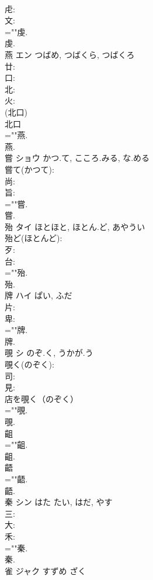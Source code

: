 \documentclass[8pt]{extreport}
\begin{document}
\begin{CJK}{UTF8}{min}
\\	虍: 
\\	文: 
\\	=""虔.
\\	虔.
\\	燕	エン	つばめ, つばくら, つばくろ		
\\	廿: 
\\	口: 
\\	北: 
\\	火: 
\\	(北口) 
\\	北口 
\\	=""燕.
\\	燕.
\\	嘗	ショウ	かつ.て, こころ.みる, な.める		
\\	嘗て(かつて): 
\\	尚: 
\\	旨: 
\\	=""嘗.
\\	嘗.
\\	殆	タイ	ほとほと, ほとん.ど, あやうい		
\\	殆ど(ほとんど): 
\\	歹: 
\\	台: 
\\	=""殆.
\\	殆.
\\	牌	ハイ	ぱい, ふだ		
\\	片: 
\\	卑: 
\\	=""牌.
\\	牌.
\\	覗	シ	のぞ.く, うかが.う		
\\	覗く(のぞく): 
\\	司: 
\\	見: 
\\	店を覗く（のぞく） 
\\	=""覗.
\\	覗.
\\	齟						
\\	=""齟.
\\	齟.
\\	齬						
\\	=""齬.
\\	齬.
\\	秦	シン	はた	たい, はだ, やす	
\\	三: 
\\	大: 
\\	禾: 
\\	=""秦.
\\	秦.
\\	雀	ジャク	すずめ	ざく	

\end{CJK}
\end{document}

